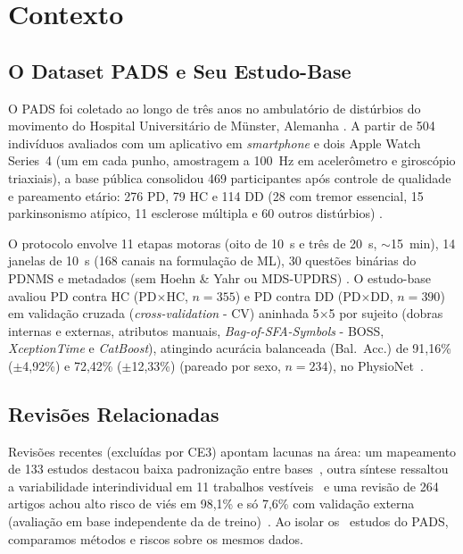 \section{Contexto} \label{sec:contexto}

\subsection{O Dataset PADS e Seu Estudo-Base}

O PADS foi coletado ao longo de três anos no ambulatório de distúrbios do
movimento do Hospital Universitário de Münster, Alemanha
\cite{varghese_machine_2024}. A partir de 504 indivíduos avaliados com um
aplicativo em \textit{smartphone} e dois Apple Watch Series~4 (um em cada punho,
amostragem a 100~Hz em acelerômetro e giroscópio triaxiais), a base pública
consolidou 469 participantes após controle de qualidade e pareamento etário: 276
PD, 79 HC e 114 DD (28 com tremor essencial, 15 parkinsonismo atípico, 11
esclerose múltipla e 60 outros distúrbios) \cite{varghese_machine_2024}.

O protocolo envolve 11 etapas motoras (oito de 10~s e três de 20~s,
$\sim$15~min), 14 janelas de 10~s (168 canais na formulação de ML), 30
questões binárias do PDNMS e metadados (sem Hoehn \& Yahr ou MDS-UPDRS)
\cite{varghese_machine_2024}. O estudo-base~\cite{varghese_machine_2024} avaliou PD contra HC (PD$\times$HC,
$n=355$) e PD contra DD (PD$\times$DD, $n=390$) em validação cruzada
(\textit{cross-validation} - CV) aninhada 5$\times$5 por sujeito (dobras
internas e externas, atributos manuais,
\textit{Bag-of-SFA-Symbols} - BOSS, \textit{XceptionTime} e \textit{CatBoost}),
atingindo acurácia balanceada (Bal.\ Acc.) de 91,16\% ($\pm$4,92\%) e 72,42\%
($\pm$12,33\%) (pareado por sexo, $n=234$), no
PhysioNet~\cite{PhysioNet-parkinsons-disease-smartwatch-1.0.0}.

\subsection{Revisões Relacionadas}

Revisões recentes (excluídas por CE3) apontam lacunas na área: um mapeamento
de 133 estudos destacou baixa padronização entre
bases~\cite{shokrpour_machine_2025}, outra síntese ressaltou a variabilidade
interindividual em 11 trabalhos vestíveis~\cite{ouabd_overview_2026} e uma
revisão de 264 artigos achou alto risco de viés em 98,1\% e só 7,6\% com
validação externa (avaliação em base independente da de
treino)~\cite{pinto_neto_machine_2026}. Ao isolar os \nTotal\ estudos
do PADS, comparamos métodos e riscos sobre os mesmos dados.
